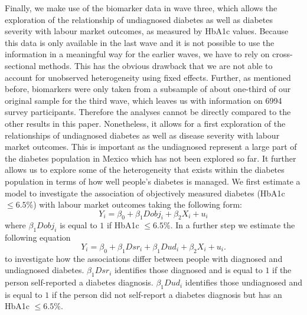Finally, we make use of the biomarker data in wave three, which allows
the exploration of the relationship of undiagnosed diabetes as well
as diabetes severity with labour market outcomes, as measured by \ac{HbA1c}
values. Because this data is only available in the last wave and it
is not possible to use the information in a meaningful way for the
earlier waves, we have to rely on cross-sectional methods. This has the
obvious drawback that we are not able to account for unobserved
heterogeneity using fixed effects. Further, as mentioned before, biomarkers
were only taken from a subsample of about one-third of our original sample
for the third wave, which leaves us with information on 6994 survey
participants. Therefore the analyses cannot be directly compared to
the other results in this paper. Nonetheless, it allows for a first
exploration of the relationships of undiagnosed diabetes as well as
disease severity with labour market outcomes. This is important as
the undiagnosed represent a large part of the diabetes population
in Mexico which has not been explored so far. It further allows us
to explore some of the heterogeneity that exists within the diabetes
population in terms of how well people's diabetes is managed. We first estimate a model to investigate the association of objectively measured diabetes (HbA1c $\leq6.5\%$) with labour market outcomes taking the following form:
\noindent 
\begin{equation}
Y_{i}=\beta_{0}+\beta_{1}Dobj_{i}+\beta_{2}X_{i}+u_{i}\label{eq:diab_objective}
\end{equation}
where $\beta_{1}Dobj_{i}$ is equal to $1$ if HbA1c $\leq6.5\%$.
In a further step we estimate the following equation
\noindent 
\begin{equation}
Y_{i}=\beta_{0}+\beta_{1}Dsr_{i}+\beta_{1}Dud_{i}+\beta_{2}X_{i}+u_{i}.\label{eq:diab_sr_ud}
\end{equation}
to investigate how the associations differ between people with diagnosed and undiagnosed diabetes. $\beta_{1}Dsr_{i}$ identifies those diagnosed and is equal to $1$ if the person self-reported a diabetes diagnosis.  $\beta_{1}Dud_{i}$ identifies those undiagnosed and is equal to $1$ if the person did not self-report a diabetes diagnosis but has an HbA1c $\leq6.5\%$.
  
  
  
  